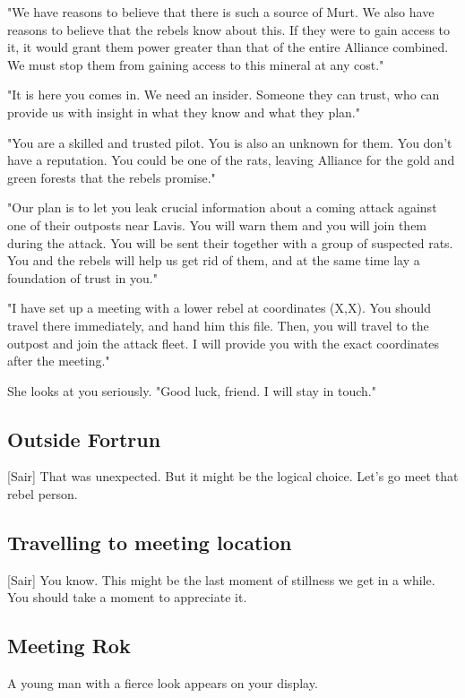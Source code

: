 \documentclass[a4paper,12pt]{article}
\begin{document}
"We have reasons to believe that there is such a source of Murt. We also have
reasons to believe that the rebels know about this. If they were to gain access to it, it would grant them power greater than that of the entire Alliance combined. We must stop them from gaining access to this mineral at any cost."

"It is here you comes in. We need an insider. Someone they can trust, who can
provide us with insight in what they know and what they plan."

"You are a skilled and trusted pilot. You is also an unknown for them. You
don't have a reputation. You could be one of the rats, leaving Alliance for
the gold and green forests that the rebels promise."

"Our plan is to let you leak crucial information about a coming attack against
one of their outposts near Lavis. You will warn them and you will join them
during the attack. You will be sent their together with a group of suspected
rats. You and the rebels will help us get rid of them, and at the same time
lay a foundation of trust in you."

"I have set up a meeting with a lower rebel at coordinates (X,X). You should
travel there immediately, and hand him this file. Then, you will travel to the
outpost and join the attack fleet. I will provide you with the exact coordinates
after the meeting."

She looks at you seriously. "Good luck, friend. I will stay in touch."

\subsection{Outside Fortrun}

[Sair] That was unexpected. But it might be the logical choice.
Let's go meet that rebel person.

\subsection{Travelling to meeting location}

[Sair] You know. This might be the last moment of stillness we get in a while.
You should take a moment to appreciate it.

\subsection{Meeting Rok}

A young man with a fierce look appears on your display.
\end{document}
